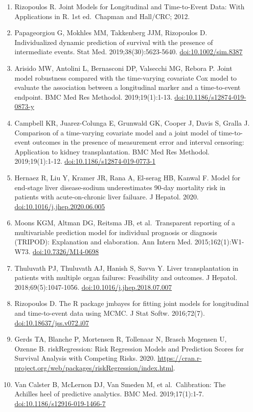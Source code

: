 \documentclass[11pt,english,]{book} %
\begin{document}
\begin{enumerate}
\item
  Rizopoulos R. Joint Models for Longitudinal and Time-to-Event Data: With Applications in R. 1st ed.~Chapman and Hall/CRC; 2012.
\item
  Papageorgiou G, Mokhles MM, Takkenberg JJM, Rizopoulos D. Individualized dynamic prediction of survival with the presence of intermediate events. Stat Med. 2019;38(30):5623-5640. \url{doi:10.1002/sim.8387}
\item
  Arisido MW, Antolini L, Bernasconi DP, Valsecchi MG, Rebora P. Joint model robustness compared with the time-varying covariate Cox model to evaluate the association between a longitudinal marker and a time-to-event endpoint. BMC Med Res Methodol. 2019;19(1):1-13. \url{doi:10.1186/s12874-019-0873-y}
\item
  Campbell KR, Juarez-Colunga E, Grunwald GK, Cooper J, Davis S, Gralla J. Comparison of a time-varying covariate model and a joint model of time-to-event outcomes in the presence of measurement error and interval censoring: Application to kidney transplantation. BMC Med Res Methodol. 2019;19(1):1-12. \url{doi:10.1186/s12874-019-0773-1}
\item
  Hernaez R, Liu Y, Kramer JR, Rana A, El-serag HB, Kanwal F. Model for end-stage liver disease-sodium underestimates 90-day mortality risk in patients with acute-on-chronic liver failuare. J Hepatol. 2020. \url{doi:10.1016/j.jhep.2020.06.005}
\item
  Moons KGM, Altman DG, Reitsma JB, et al.~Transparent reporting of a multivariable prediction model for individual prognosis or diagnosis (TRIPOD): Explanation and elaboration. Ann Intern Med. 2015;162(1):W1-W73. \url{doi:10.7326/M14-0698}
\item
  Thuluvath PJ, Thuluvath AJ, Hanish S, Savva Y. Liver transplantation in patients with multiple organ failures: Feasibility and outcomes. J Hepatol. 2018;69(5):1047-1056. \url{doi:10.1016/j.jhep.2018.07.007}
\item
  Rizopoulos D. The R package jmbayes for fitting joint models for longitudinal and time-to-event data using MCMC. J Stat Softw. 2016;72(7). \url{doi:10.18637/jss.v072.i07}
\item
  Gerds TA, Blanche P, Mortensen R, Tollenaar N, Brasch Mogensen U, Ozenne B. riskRegression: Risk Regression Models and Prediction Scores for Survival Analysis with Competing Risks. 2020. \url{https://cran.r-project.org/web/packages/riskRegression/index.html}.
\item
  Van Calster B, McLernon DJ, Van Smeden M, et al.~Calibration: The Achilles heel of predictive analytics. BMC Med. 2019;17(1):1-7. \url{doi:10.1186/s12916-019-1466-7}

\end{enumerate}
\end{document}
